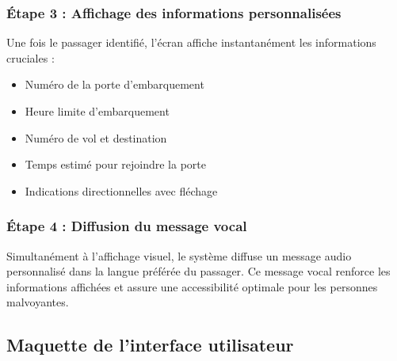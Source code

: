 \documentclass[12pt,a4paper]{article}
\begin{document}
\subsubsection{Étape 3 : Affichage des informations personnalisées}

Une fois le passager identifié, l'écran affiche instantanément les informations cruciales :

\begin{itemize}
\item Numéro de la porte d'embarquement
\item Heure limite d'embarquement
\item Numéro de vol et destination
\item Temps estimé pour rejoindre la porte
\item Indications directionnelles avec fléchage
\end{itemize}

\subsubsection{Étape 4 : Diffusion du message vocal}

Simultanément à l'affichage visuel, le système diffuse un message audio personnalisé dans la langue préférée du passager. Ce message vocal renforce les informations affichées et assure une accessibilité optimale pour les personnes malvoyantes.

\subsection{Maquette de l'interface utilisateur}
\end{document}
